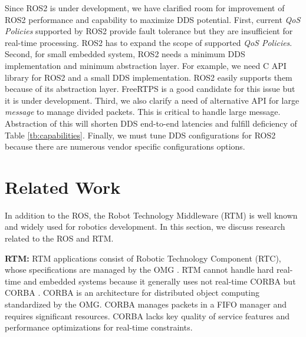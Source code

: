 \documentclass{sig-alternate-05-2015}
\begin{document}
Since ROS2 is under development, we have clarified room for improvement of ROS2 performance and capability to maximize DDS potential.
First, current \emph{QoS Policies} supported by ROS2 provide fault tolerance but they are insufficient for real-time processing.
ROS2 has to expand the scope of supported \emph{QoS Policies}.
Second, for small embedded system, ROS2 needs a minimum DDS implementation and minimum abstraction layer.
For example, we need C API library for ROS2 and a small DDS implementation.
ROS2 easily supports them because of its abstraction layer.
FreeRTPS \cite{freertps} \cite{small@roscon2015} is a good candidate for this issue but it is under development.
Third, we also clarify a need of alternative API for large \emph{message} to manage divided packets.
This is critical to handle large message.
Abstraction of this will shorten DDS end-to-end latencies and fulfill deficiency of Table \ref{tb:capabilities}.
Finally, we must tune DDS configurations for ROS2 because there are numerous vendor specific configurations options.


\vspace{-3mm}
\section{Related Work}
\label{sec:orgheadline3}

In addition to the ROS, the Robot Technology Middleware (RTM) \cite{ando2005rt} is well known and widely used for robotics development. 
In this section, we discuss research related to the ROS and RTM.

\textbf{RTM:} 
RTM applications consist of Robotic Technology Component (RTC), whose specifications are managed by the OMG \cite{omg}. 
RTM cannot handle hard real-time and embedded systems because it generally uses not real-time CORBA \cite{schmidt1998design} but CORBA \cite{vinoski1997corba}.
CORBA is an architecture for distributed object computing standardized by the OMG.
CORBA manages packets in a FIFO manager and requires significant resources. 
CORBA lacks key quality of service features and performance optimizations for real-time constraints.
\end{document}
